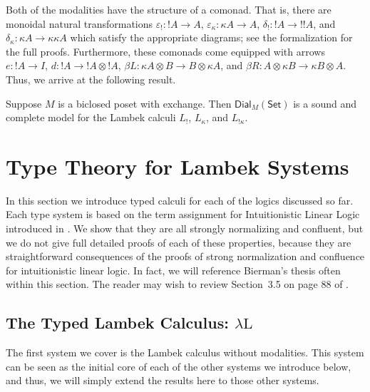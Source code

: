 \documentclass{llncs}
\let\mto\to                     %
\let\to\relax                   %
\newcommand{\to}{\rightarrow}
\newcommand{\Set}{\mathsf{Set}}
\newcommand{\Dial}[2]{\mathsf{Dial}_{#1}(#2)}
\begin{document}
Both of the modalities have the structure of a comonad.  That is,
there are monoidal natural transformations $\varepsilon_! : !A \mto
A$, $\varepsilon_\kappa : \kappa A \mto A$, $\delta_! : !A \mto !!A$,
and $\delta_\kappa : \kappa A \mto \kappa\kappa A$ which satisfy the
appropriate diagrams; see the formalization for the full
proofs. Furthermore, these comonads come equipped with arrows $e : !A
\mto I$, $d : !A \mto !A \otimes !A$, $\beta L : \kappa A \otimes B \mto B
\otimes \kappa A$, and $\beta R : A \otimes \kappa B \mto \kappa B
\otimes A$.  Thus, we arrive at the following result.

\begin{theorem}
  \label{thm:sound-dial-exchange-!}
  Suppose $M$ is a biclosed poset with exchange.  Then
  $\Dial{M}{\Set}$ is a sound and complete model for the Lambek
  calculi $L_!$, $L_\kappa$, and $L_{!\kappa}$.
\end{theorem}

\section{Type Theory for Lambek Systems}
\label{sec:typed_lambek_calculi}
In this section we introduce typed calculi for each of the logics
discussed so far.  Each type system is based on the term assignment
for  Intuitionistic Linear Logic introduced 
in \cite{benton1993}.
We show that they are all strongly normalizing
and confluent, but we do not give full detailed proofs of each of
these properties, because they are straightforward consequences of the
proofs of strong normalization and confluence for intuitionistic
linear logic.  In fact, we will reference Bierman's thesis often
within this section.  The reader may wish to review Section~3.5 on
page 88 of \cite{Bierman:1994}.

\subsection{The Typed Lambek Calculus: $\lambda\text{L}$}
\label{subsec:the_typed_lambek_calculus_lambda-l}

The first system we cover is the Lambek calculus without
modalities. This system can be seen as the initial core of each of the
other systems we introduce below, and thus, we will simply extend the
results here to those other systems.  
\end{document}

